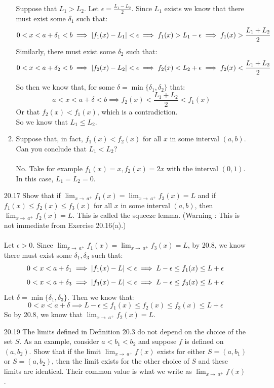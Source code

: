 \begin{enumerate}
\begin{enumerate}
        Suppose that $L_1 > L_2$. Let $\epsilon = \frac{L_1-L_2}{2}$. Since $L_1$ exists we know that there must exist some $\delta_1$ such that:
        $$0 < x < a + \delta_1 < b \implies \left\vert f_1(x) - L_1 \right\vert < \epsilon \implies f_1(x) > L_1 - \epsilon \implies f_1(x) > \frac{L_1 + L_2}{2}$$
        Similarly, there must exist some $\delta_2$ such that:
        $$0 < x < a + \delta_2 < b \implies \left\vert f_2(x) - L_2 \right\vert < \epsilon \implies f_2(x) < L_2 + \epsilon \implies f_2(x) < \frac{L_1 + L_2}{2}$$

        So then we know that, for some $\delta = \min \{\delta_1, \delta_2\}$ that:
        $$a < x < a + \delta < b \implies f_2(x) < \frac{L_1+L_2}{2} < f_1(x)$$
        Or that $f_2(x) < f_1(x)$, which is a contradiction.\\

        So we know that $L_1 \leq L_2$.
      \item Suppose that, in fact, $f_1(x) < f_2(x)$ for all $x$ in some interval $(a,b)$. Can you conclude that $L_1 < L_2$?\\\\

        No. Take for example $f_1(x) = x, f_2(x) = 2x$ with the interval $(0,1)$. In this case, $L_1 = L_2 = 0$.
    \end{enumerate}
  \item [20.17]
    Show that if $\lim_{x \to\ a^+} f_1(x) = \lim_{x \to\ a^+} f_3(x) = L$ and if $f_1(x) \leq f_2(x) \leq f_3(x)$ for all $x$ in some interval $(a,b)$, then $\lim_{x \to\ a^+} f_2(x) = L$. This is called the squeeze lemma. (Warning : This is not immediate from Exercise 20.16(a).)\\\\

    Let $\epsilon > 0$. Since $\lim_{x \to\ a^+} f_1(x) = \lim_{x \to\ a^+} f_3(x) = L$, by 20.8, we know there must exist some $\delta_1, \delta_3$ such that:
    $$0 < x < a + \delta_1 \implies \left\vert f_1(x) - L \right\vert < \epsilon \implies L - \epsilon \leq f_1(x) \leq L + \epsilon$$
    $$0 < x < a + \delta_3 \implies \left\vert f_3(x) - L \right\vert < \epsilon \implies L - \epsilon \leq f_3(x) \leq L + \epsilon$$
    Let $\delta = \min \{\delta_1, \delta_3 \}$. Then we know that:
    $$0 < x < a + \delta \implies L - \epsilon \leq f_1(x) \leq f_2(x) \leq f_3(x) \leq L + \epsilon$$
    So by 20.8, we know that $\lim_{x \to\ a^+} f_2(x) = L$.
  \item [20.19]
    The limits defined in Definition 20.3 do not depend on the choice of the set $S$. As an example, consider $a < b_1 < b_2$ and suppose $f$ is defined on $(a,b_2)$. Show that if the limit $\lim_{x \to\ a^+} f(x)$ exists for either $S = (a,b_1)$ or $S = (a,b_2)$, then the limit exists for the other choice of $S$ and these limits are identical. Their common value is what we write as $\lim_{x \to\ a^+} f(x)$.\\\\


\end{enumerate}
